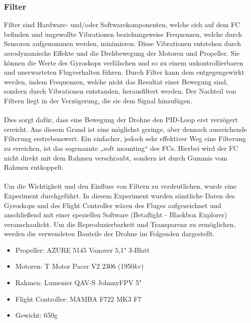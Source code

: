         \newpage
        \subsubsection[Filter]{Filter}
        Filter sind Hardware- und/oder Softwarekomponenten, welche sich auf dem FC befinden und
        ungewollte Vibrationen beziehungsweise Frequenzen, welche durch Sensoren aufgenommen werden,
        minimieren. Diese Vibrationen entstehen durch aerodynamische Effekte und die Drehbewegung
        der Motoren und Propeller. Sie können die Werte des Gyroskops verfälschen und so zu einem
        unkontrollierbaren und unerwarteten Flugverhalten führen. Durch Filter kann dem entgegengewirkt
        werden, indem Frequenzen, welche nicht das Resultat einer Bewegung sind, sondern durch Vibrationen
        entstanden, herausfiltert werden. Der Nachteil von Filtern liegt in der Verzögerung, die sie
        dem Signal hinzufügen.\\
        \\
        Dies sorgt dafür, dass eine Bewegung der Drohne den PID-Loop erst verzögert
        erreicht. Aus diesem Grund ist eine möglichst geringe, aber dennoch ausreichende Filterung
        erstrebenswert. Ein einfacher, jedoch sehr effektiver Weg eine Filterung zu erreichen, ist das
        sogenannte „soft mounting“ des FCs. Hierbei wird der FC nicht direkt mit dem Rahmen verschraubt,
        sondern ist durch Gummis vom Rahmen entkoppelt. \\
        \\
        Um die Wichtigkeit und den Einfluss von Filtern zu verdeutlichen, wurde eine Experiment durchgeführt.
        In diesem Experiment wurden sämtliche Daten des Gyroskops und des Flight Controller wären des Fluges
        aufgezeichnet und anschließend mit einer speziellen Software (Betaflight - Blackbox Explorer)
        veranschaulicht. Um die Reproduzierbarkeit und Transparenz zu ermöglichen, werden die verwendeten
        Bauteile der Drohne im Folgenden dargestellt. \\

        \begin{itemize}
            \item[] Propeller: AZURE 5145 Vanover 5,1" 3-Blatt
            \item[] Motoren: T Motor Pacer V2 2306 (1950$kv$)
            \item[] Rahmen: Lumenier QAV-S JohnnyFPV 5"
            \item[] Flight Controller: MAMBA F722 MK3 F7
            \item[] Gewicht: 650g
        \end{itemize}
        \vspace{0.5cm}

